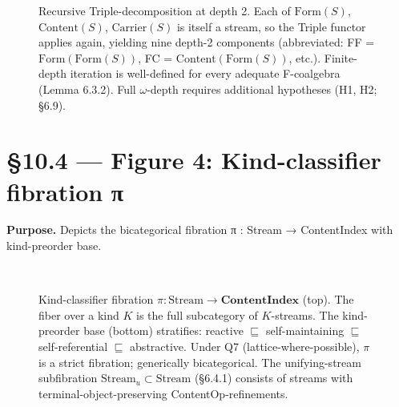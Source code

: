 \documentclass[11pt, openany]{book}
\newcommand{\sectionbreak}{\clearpage}
\begin{document}
\begin{figure}[htbp]
\centering
{}
\caption{Recursive Triple-decomposition at depth 2. Each of $\mathrm{Form}(S)$, $\mathrm{Content}(S)$, $\mathrm{Carrier}(S)$ is itself a stream, so the Triple functor applies again, yielding nine depth-2 components (abbreviated: FF = $\mathrm{Form}(\mathrm{Form}(S))$, FC = $\mathrm{Content}(\mathrm{Form}(S))$, etc.). Finite-depth iteration is well-defined for every adequate F-coalgebra (Lemma 6.3.2). Full $\omega$-depth requires additional hypotheses (H1, H2; §6.9).}
\label{fig:recursive-decomposability}
\end{figure}

\sectionbreak

\section{§10.4 --- Figure 4: Kind-classifier fibration π}

\textbf{Purpose.} Depicts the bicategorical fibration π : Stream → ContentIndex with kind-preorder base.

\begin{figure}[htbp]
\centering
{}
\\[1em]
\caption{Kind-classifier fibration $\pi : \mathrm{Stream} \to \mathbf{ContentIndex}$ (top). The fiber over a kind $K$ is the full subcategory of $K$-streams. The kind-preorder base (bottom) stratifies: reactive $\sqsubseteq$ self-maintaining $\sqsubseteq$ self-referential $\sqsubseteq$ abstractive. Under Q7 (lattice-where-possible), $\pi$ is a strict fibration; generically bicategorical. The unifying-stream subfibration $\mathrm{Stream}_u \subset \mathrm{Stream}$ (§6.4.1) consists of streams with terminal-object-preserving ContentOp-refinements.}
\label{fig:kind-classifier-fibration}
\end{figure}
\end{document}
